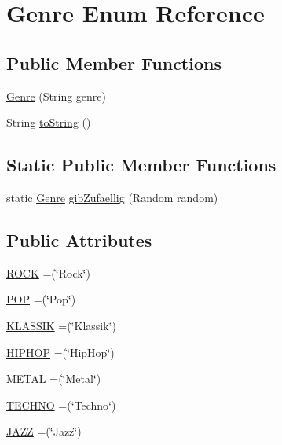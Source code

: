 \hypertarget{enumGenre}{\section{Genre Enum Reference}
\label{enumGenre}
}
\subsection*{Public Member Functions}
\begin{DoxyCompactItemize}
\item 
\hyperlink{enumGenre_a8f0f5830bdc68780662b85b2de8788dd}{Genre} (String genre)
\item 
String \hyperlink{enumGenre_a966802306a289298a9a11a6610cffeaa}{to\-String} ()
\end{DoxyCompactItemize}
\subsection*{Static Public Member Functions}
\begin{DoxyCompactItemize}
\item 
static \hyperlink{enumGenre}{Genre} \hyperlink{enumGenre_ae9eb554721c8e23706cf8f3042edb854}{gib\-Zufaellig} (Random random)
\end{DoxyCompactItemize}
\subsection*{Public Attributes}
\begin{DoxyCompactItemize}
\item 
\hyperlink{enumGenre_abeba5ef2f501e1284b2a64cc3b153153}{R\-O\-C\-K} =(\char`\"{}Rock\char`\"{})
\item 
\hyperlink{enumGenre_a68166334621841bdb574dc1fbe97f0b8}{P\-O\-P} =(\char`\"{}Pop\char`\"{})
\item 
\hyperlink{enumGenre_a78a8368dbd53da52a36348fe432eda31}{K\-L\-A\-S\-S\-I\-K} =(\char`\"{}Klassik\char`\"{})
\item 
\hyperlink{enumGenre_a920a44dbb49797e79965fddc177c36d5}{H\-I\-P\-H\-O\-P} =(\char`\"{}Hip\-Hop\char`\"{})
\item 
\hyperlink{enumGenre_a45892876ee0f75ebe59202cf7d57fc78}{M\-E\-T\-A\-L} =(\char`\"{}Metal\char`\"{})
\item 
\hyperlink{enumGenre_af7ee5c3305bd4ab99555c3c5bd92e1a9}{T\-E\-C\-H\-N\-O} =(\char`\"{}Techno\char`\"{})
\item 
\hyperlink{enumGenre_a987305efa37d1df58608a8635407add0}{J\-A\-Z\-Z} =(\char`\"{}Jazz\char`\"{})
\end{DoxyCompactItemize}


